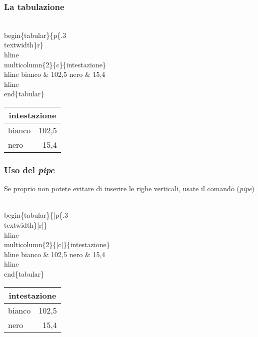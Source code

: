 \documentclass[svgnames,%
	ucs,%
	pdftex]{guitbeamer}
\begin{document}
\begin{frame}
  \frametitle{La tabulazione}
	\begin{LaTeXcode}
		\\begin\{tabular\}\{\alert{p\{.3\\textwidth\}}r\}\
		\\hline \n
		\\multicolumn\{2\}\{c\}\{intestazione\}\bs\bs \
		\\hline \n
		\hspace*{5ex}bianco \& 102,5 \bs\bs\n
		\hspace*{5ex}nero   \& 15,4 \bs\bs\
		\\hline\n
		\\end\{tabular\}
	\end{LaTeXcode}
	\begin{LaTeXoutput}
		\begin{tabular}{p{.3\textwidth}r}\hline
		\multicolumn{2}{c}{intestazione}\\\hline
		bianco & 102,5 \\
		nero   & 15,4 \\\hline
		\end{tabular}
	\end{LaTeXoutput}
\end{frame}
\begin{frame}
  \frametitle{Uso del \textit{pipe}}
	Se proprio non potete evitare di inserire le righe verticali, usate il comando \LCmd[]{|} (\textit{pipe})
	\begin{LaTeXcode}
		\\begin\{tabular\}\{\alert{|}p\{.3\\textwidth\}\alert{|}r\alert{|}\}\
		\\hline \n
		\\multicolumn\{2\}\{\alert{|}c\alert{|}\}\{intestazione\}\bs\bs \
		\\hline \n
		\hspace*{5ex}bianco \& 102,5 \bs\bs\n
		\hspace*{5ex}nero   \& 15,4 \bs\bs\
		\\hline\n
		\\end\{tabular\}
	\end{LaTeXcode}
	\begin{LaTeXoutput}
		\begin{tabular}{|p{}|r|}\hline
		\multicolumn{2}{|c|}{intestazione}\\\hline
		bianco & 102,5 \\
		nero   & 15,4 \\\hline
		\end{tabular}
	\end{LaTeXoutput}
\end{frame}
\end{document}

